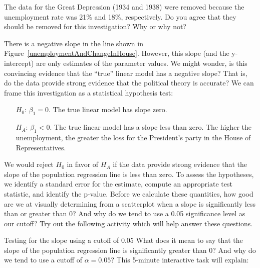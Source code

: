 \D{\newpage}

\begin{exercisewrap}
\begin{nexercise}
The data for the Great Depression (1934 and 1938) were removed because the unemployment rate was 21\% and 18\%, respectively. Do you agree that they should be removed for this investigation? Why or why not?\footnotemark 
\end{nexercise}
\end{exercisewrap}

There is a negative slope in the line shown in Figure~\ref{unemploymentAndChangeInHouse}. However, this slope (and the y-intercept) are only estimates of the parameter values. We might wonder, is this convincing evidence that the ``true'' linear model has a negative slope? That is, do the data provide strong evidence that the political theory is accurate?  We can frame this investigation as a statistical hypothesis test:
\begin{itemize}
\item[$H_0$:] $\beta_1 = 0$. The true linear model has slope zero.
\item[$H_A$:] $\beta_1 < 0$. The true linear model has a slope less than zero. The higher the unemployment, the greater the loss for the President's party in the House of Representatives.
\end{itemize}
We would reject $H_0$ in favor of $H_A$ if the data provide strong evidence that the slope of the population regression line is less than zero. To assess the hypotheses, we identify a standard error for the estimate, compute an appropriate test statistic, and identify the p-value.
Before we calculate these quantities, how good are we at visually determining from a scatterplot when a slope is significantly less than or greater than 0?  And why do we tend to use a 0.05 significance level as our cutoff?  Try out the following activity which will help answer these questions.

\begin{onebox}{Testing for the slope using a cutoff of 0.05}
  What does it mean to say that the slope of the population regression line is significantly greater than 0?  And why do we tend to use a cutoff of $\alpha = 0.05$?   
  This 5-minute interactive task will explain: 
  \begin{center}
  \end{center}
\end{onebox}


